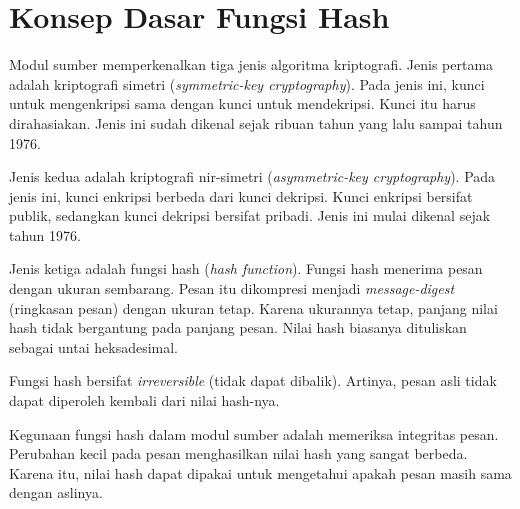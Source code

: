 \section{Konsep Dasar Fungsi Hash}

Modul sumber memperkenalkan tiga jenis algoritma kriptografi. Jenis pertama adalah
kriptografi simetri (\textit{symmetric-key cryptography}). Pada jenis ini, kunci
untuk mengenkripsi sama dengan kunci untuk mendekripsi. Kunci itu harus
dirahasiakan. Jenis ini sudah dikenal sejak ribuan tahun yang lalu sampai tahun
1976.

Jenis kedua adalah kriptografi nir-simetri (\textit{asymmetric-key cryptography}).
Pada jenis ini, kunci enkripsi berbeda dari kunci dekripsi. Kunci enkripsi bersifat
publik, sedangkan kunci dekripsi bersifat pribadi. Jenis ini mulai dikenal sejak
tahun 1976.

Jenis ketiga adalah fungsi hash (\textit{hash function}). Fungsi hash menerima
pesan dengan ukuran sembarang. Pesan itu dikompresi menjadi \textit{message-digest}
(ringkasan pesan) dengan ukuran tetap. Karena ukurannya tetap, panjang nilai hash
tidak bergantung pada panjang pesan. Nilai hash biasanya dituliskan sebagai untai
heksadesimal.

Fungsi hash bersifat \textit{irreversible} (tidak dapat dibalik). Artinya, pesan
asli tidak dapat diperoleh kembali dari nilai hash-nya.

Kegunaan fungsi hash dalam modul sumber adalah memeriksa integritas pesan.
Perubahan kecil pada pesan menghasilkan nilai hash yang sangat berbeda. Karena
itu, nilai hash dapat dipakai untuk mengetahui apakah pesan masih sama dengan
aslinya.
